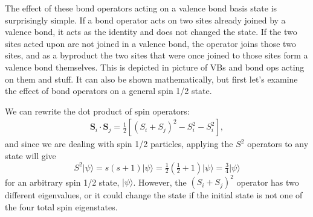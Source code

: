 The effect of these bond operators acting on a valence bond basis state is 
surprisingly simple.  If a bond operator acts on two sites already joined by a valence
bond, it acts as the identity and does not changed the state.  If the two sites acted upon are 
not joined in a valence bond, the operator joins those two sites, and as a byproduct the 
two sites that were once joined to those sites form a valence bond themselves.
This is depicted in {\color{red} picture of VBs and bond ops acting on them and stuff.}
It can also be shown mathematically, but first let's examine the effect of bond operators
on a general spin 1/2 state.

We can rewrite the dot product of spin operators:
\begin{eqnarray}
\mathbf{S}_i\cdot \mathbf{S}_j = \tfrac{1}{2}\left[ \left(S_i + S_j\right)^2 -S_i^2-S_i^2 \right],
\end{eqnarray}
and since we are dealing with spin 1/2 particles, applying the $S^2$ operators to any state will
give 
\begin{equation}
S^2\lvert \psi\rangle = s(s+1)\lvert \psi \rangle = \tfrac{1}{2}(\tfrac{1}{2} + 1)\lvert \psi \rangle
	= \tfrac{3}{4}\lvert\psi\rangle
\end{equation}
for an arbitrary spin 1/2 state, $\lvert \psi\rangle$.  However, the $\left(S_i + S_j\right)^2$ 
operator has two different eigenvalues, or it could change the state
if the initial state is not one of the four total spin eigenstates.

